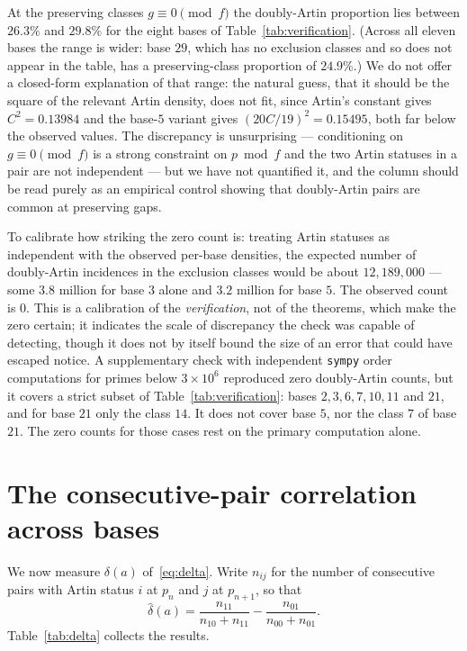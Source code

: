 \documentclass[11pt,reqno]{amsart}
\theoremstyle{plain}
\theoremstyle{definition}
\begin{document}
At the preserving classes $g \equiv 0 \pmod f$ the doubly-Artin proportion
lies between $26.3\%$ and $29.8\%$ for the eight bases of
Table~\ref{tab:verification}. (Across all eleven bases the range is wider: base
$29$, which has no exclusion classes and so does not appear in the table, has a
preserving-class proportion of $24.9\%$.) We do not offer a closed-form explanation
of that range: the natural guess, that it should be the square of the relevant
Artin density, does not fit, since Artin's constant gives $C^2 = 0.13984$ and
the base-$5$ variant gives $(20C/19)^2 = 0.15495$, both far below the observed
values. The discrepancy is unsurprising --- conditioning on $g \equiv 0 \pmod
f$ is a strong constraint on $p \bmod f$ and the two Artin statuses in a pair
are not independent --- but we have not quantified it, and the column should
be read purely as an empirical control showing that doubly-Artin pairs are
common at preserving gaps.

To calibrate how striking the zero count is: treating Artin statuses as
independent with the observed per-base densities, the expected number of
doubly-Artin incidences in the exclusion classes would be about
$12{,}189{,}000$ --- some $3.8$ million for base $3$ alone and $3.2$ million
for base $5$. The observed count is $0$. This is a calibration of the
\emph{verification}, not of the theorems, which make the zero certain; it
indicates the scale of discrepancy the check was capable of detecting, though
it does not by itself bound the size of an error that could have escaped
notice. A supplementary check with independent \texttt{sympy} order computations for
primes below $3 \times 10^6$ reproduced zero doubly-Artin counts, but it
covers a strict subset of Table~\ref{tab:verification}: bases $2, 3, 6, 7, 10,
11$ and $21$, and for base $21$ only the class $14$. It does not cover base
$5$, nor the class $7$ of base $21$. The zero counts for those cases rest on
the primary computation alone.

\section{The consecutive-pair correlation across bases}
\label{sec:delta}

We now measure $\delta(a)$ of~\eqref{eq:delta}. Write $n_{ij}$ for the number
of consecutive pairs with Artin status $i$ at $p_n$ and $j$ at $p_{n+1}$, so
that
\[
  \widehat{\delta}(a) = \frac{n_{11}}{n_{10}+n_{11}} - \frac{n_{01}}{n_{00}+n_{01}}.
\]
Table~\ref{tab:delta} collects the results.
\end{document}
